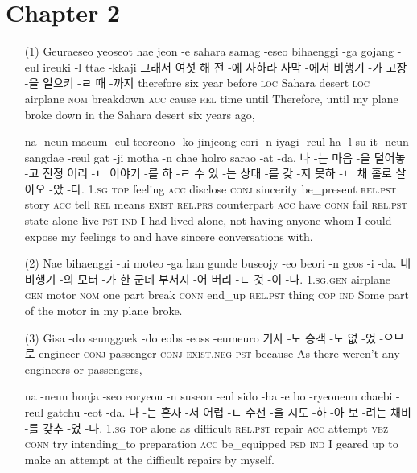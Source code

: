\section*{Chapter 2}

\begin{itemize}
\item [(1)]
\tgl
		{Geuraeseo yeoseot hae jeon -e sahara samag -eseo bihaenggi -ga gojang -eul ireuki -l ttae -kkaji}
		{그래서 여섯 해 전 -에 사하라 사막 -에서 비행기 -가 고장 -을 일으키 -ㄹ 때 -까지}
		{therefore	six	year	before	\textsc{loc}	Sahara	desert	\textsc{loc}	airplane	\textsc{nom}	breakdown	\textsc{acc}	cause	\textsc{rel}	time	until}
		{Therefore, until my plane broke down in the Sahara desert six years ago,}
		
\tgl
		{na -neun maeum -eul teoreono -ko jinjeong eori -n iyagi -reul ha -l su it -neun sangdae -reul gat -ji motha -n chae holro sarao -at -da.}
		{나 -는 마음 -을 털어놓 -고 진정 어리 -ㄴ 이야기 -를 하 -ㄹ 수 있 -는 상대 -를 갖 -지 못하 -ㄴ 채 홀로 살아오 -았 -다.}
		{\textsc{1.sg}	\textsc{top}	feeling	\textsc{acc}	disclose	\textsc{conj}	sincerity	be\_present	\textsc{rel.pst}	story	\textsc{acc}	tell	\textsc{rel}	means	\textsc{exist}	\textsc{rel.prs}	counterpart	\textsc{acc}	have	\textsc{conn}	fail	\textsc{rel.pst}	state	alone	live	\textsc{pst}	\textsc{ind}}
		{I had lived alone, not having anyone whom I could expose my feelings to and have sincere conversations with.}
		
\item [(2)]
\tgl
		{Nae bihaenggi -ui moteo -ga han gunde buseojy -eo beori -n geos -i -da.}
		{내 비행기 -의 모터 -가 한 군데 부서지 -어 버리 -ㄴ 것 -이 -다.}
		{\textsc{1.sg.gen}	airplane	\textsc{gen}	motor	\textsc{nom}	one	part	break	\textsc{conn}	end\_up	\textsc{rel.pst}	thing	\textsc{cop}	\textsc{ind}}
		{Some part of the motor in my plane broke.}
		
\item [(3)]
\tgl
		{Gisa -do seunggaek -do eobs -eoss -eumeuro}
		{기사 -도 승객 -도 없 -었 -으므로}
		{engineer	\textsc{conj}	passenger	\textsc{conj}	\textsc{exist.neg}	\textsc{pst}	because}
		{As there weren't any engineers or passengers,}
		
\tgl
		{na -neun honja -seo eoryeou -n suseon -eul sido -ha -e bo -ryeoneun chaebi -reul gatchu -eot -da.}
		{나 -는 혼자 -서 어렵 -ㄴ 수선 -을 시도 -하 -아 보 -려는 채비 -를 갖추 -었 -다.}
		{\textsc{1.sg}	\textsc{top}	alone	as	difficult	\textsc{rel.pst}	repair	\textsc{acc}	attempt	\textsc{vbz}	\textsc{conn}	try	intending\_to	preparation	\textsc{acc}	be\_equipped	\textsc{psd}	\textsc{ind}}
		{I geared up to make an attempt at the difficult repairs by myself.}
		

\end{itemize}
